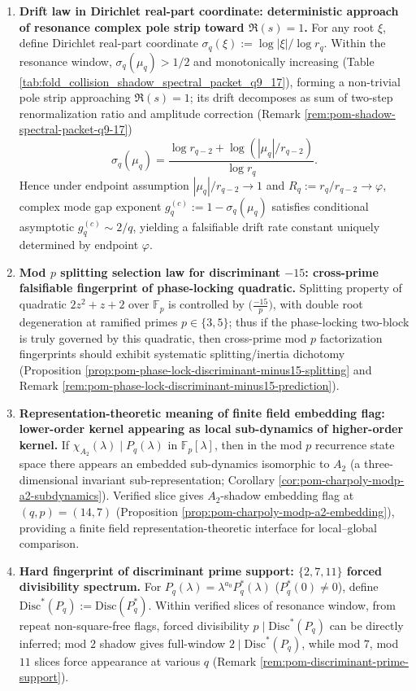 \begin{enumerate}
  \item \textbf{Drift law in Dirichlet real-part coordinate: deterministic approach of resonance complex pole strip toward \texorpdfstring{$\Re(s)=1$}{Re(s)=1}.}
  For any root \(\xi\), define Dirichlet real-part coordinate \(\sigma_q(\xi):=\log|\xi|/\log r_q\).
  Within the resonance window, \(\sigma_q(\mu_q)>1/2\) and monotonically increasing (Table \ref{tab:fold_collision_shadow_spectral_packet_q9_17}), forming a non-trivial pole strip approaching \(\Re(s)=1\); its drift decomposes as sum of two-step renormalization ratio and amplitude correction (Remark \ref{rem:pom-shadow-spectral-packet-q9-17})
  \[
  \sigma_q(\mu_q)=\frac{\log r_{q-2}+\log(|\mu_q|/r_{q-2})}{\log r_q}.
  \]
  Hence under endpoint assumption \(|\mu_q|/r_{q-2}\to 1\) and \(R_q:=r_q/r_{q-2}\to\varphi\), complex mode gap exponent \(g_q^{(c)}:=1-\sigma_q(\mu_q)\) satisfies conditional asymptotic \(g_q^{(c)}\sim 2/q\), yielding a falsifiable drift rate constant uniquely determined by endpoint \(\varphi\).

  \item \textbf{Mod \texorpdfstring{$p$}{p} splitting selection law for discriminant \texorpdfstring{$-15$}{-15}: cross-prime falsifiable fingerprint of phase-locking quadratic.}
  Splitting property of quadratic \(2z^2+z+2\) over \(\mathbb{F}_p\) is controlled by \(\bigl(\frac{-15}{p}\bigr)\), with double root degeneration at ramified primes \(p\in\{3,5\}\);
  thus if the phase-locking two-block is truly governed by this quadratic, then cross-prime mod \(p\) factorization fingerprints should exhibit systematic splitting/inertia dichotomy (Proposition \ref{prop:pom-phase-lock-discriminant-minus15-splitting} and Remark \ref{rem:pom-phase-lock-discriminant-minus15-prediction}).

  \item \textbf{Representation-theoretic meaning of finite field embedding flag: lower-order kernel appearing as local sub-dynamics of higher-order kernel.}
  If \(\chi_{A_2}(\lambda)\mid P_q(\lambda)\) in \(\mathbb{F}_p[\lambda]\), then in the mod \(p\) recurrence state space there appears an embedded sub-dynamics isomorphic to \(A_2\) (a three-dimensional invariant sub-representation; Corollary \ref{cor:pom-charpoly-modp-a2-subdynamics}).
  Verified slice gives \(A_2\)-shadow embedding flag at \((q,p)=(14,7)\) (Proposition \ref{prop:pom-charpoly-modp-a2-embedding}), providing a finite field representation-theoretic interface for local--global comparison.

  \item \textbf{Hard fingerprint of discriminant prime support: \(\{2,7,11\}\) forced divisibility spectrum.}
  For \(P_q(\lambda)=\lambda^{a_0}P_q^\ast(\lambda)\) (\(P_q^\ast(0)\ne 0\)), define \(\mathrm{Disc}^\ast(P_q):=\mathrm{Disc}(P_q^\ast)\).
  Within verified slices of resonance window, from repeat non-square-free flags, forced divisibility \(p\mid \mathrm{Disc}^\ast(P_q)\) can be directly inferred; mod \(2\) shadow gives full-window \(2\mid \mathrm{Disc}^\ast(P_q)\), while mod \(7\), mod \(11\) slices force appearance at various \(q\) (Remark \ref{rem:pom-discriminant-prime-support}).


\end{enumerate}
